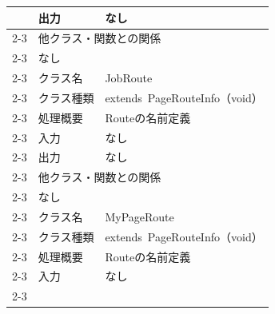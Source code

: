 \begin{longtable}{|c|l|l|}
                            & 出力                                                & なし                                            \\ \cline{2-3}
                            & \multicolumn{2}{l|}{他クラス・関数との関係}                                                                  \\ \cline{2-3}
                            & \multicolumn{2}{p{14cm}|}{なし}                                                                     \\ \cline{2-3}
                            & クラス名                                              & JobRoute                                      \\ \cline{2-3}
                            & クラス種類                                             & extends\ PageRouteInfo（void）                  \\ \cline{2-3}
                            & 処理概要                                              & \multicolumn{1}{p{12cm}|}{Routeの名前定義}         \\ \cline{2-3}
                            & 入力                                                & なし                                            \\ \cline{2-3}
                            & 出力                                                & なし                                            \\ \cline{2-3}
                            & \multicolumn{2}{l|}{他クラス・関数との関係}                                                                  \\ \cline{2-3}
                            & \multicolumn{2}{p{14cm}|}{なし}                                                                     \\ \cline{2-3}
                            & クラス名                                              & MyPageRoute                                   \\ \cline{2-3}
                            & クラス種類                                             & extends\ PageRouteInfo（void）                  \\ \cline{2-3}
                            & 処理概要                                              & \multicolumn{1}{p{12cm}|}{Routeの名前定義}         \\ \cline{2-3}
                            & 入力                                                & なし                                            \\ \cline{2-3}

\end{longtable}
